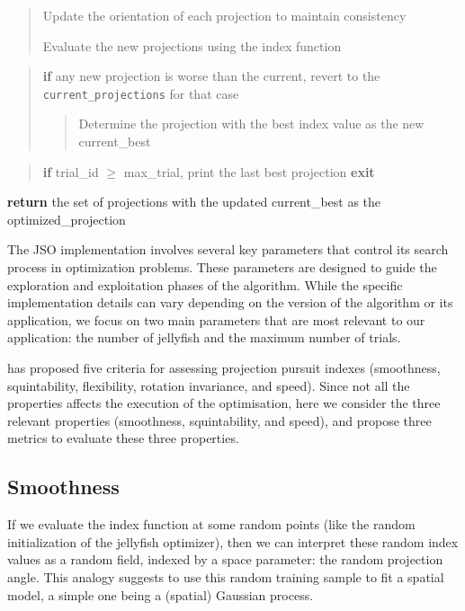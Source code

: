 \documentclass[
  number,
  preprint,
  3p]{elsarticle}
\begin{document}
\begin{tcolorbox}
\begin{quote}
Update the orientation of each projection to maintain consistency

Evaluate the new projections using the index function
\end{quote}

\begin{quote}
\textbf{if} any new projection is worse than the current, revert to the
\texttt{current\_projections} for that case

\begin{quote}
Determine the projection with the best index value as the new
current\_best
\end{quote}
\end{quote}

\begin{quote}
\textbf{if} trial\_id \(\geq\) max\_trial, print the last best
projection \textbf{exit}
\end{quote}

\textbf{return} the set of projections with the updated current\_best as
the optimized\_projection

\end{tcolorbox}

The JSO implementation involves several key parameters that control its
search process in optimization problems. These parameters are designed
to guide the exploration and exploitation phases of the algorithm. While
the specific implementation details can vary depending on the version of
the algorithm or its application, we focus on two main parameters that
are most relevant to our application: the number of jellyfish and the
maximum number of trials.

\citet{laa_using_2020} has proposed five criteria for assessing
projection pursuit indexes (smoothness, squintability, flexibility,
rotation invariance, and speed). Since not all the properties affects
the execution of the optimisation, here we consider the three relevant
properties (smoothness, squintability, and speed), and propose three
metrics to evaluate these three properties.

\hypertarget{sec-smoothness}{%
\subsection{Smoothness}\label{sec-smoothness}}

If we evaluate the index function at some random points (like the random
initialization of the jellyfish optimizer), then we can interpret these
random index values as a random field, indexed by a space parameter: the
random projection angle. This analogy suggests to use this random
training sample to fit a spatial model, a simple one being a (spatial)
Gaussian process.
\end{document}
